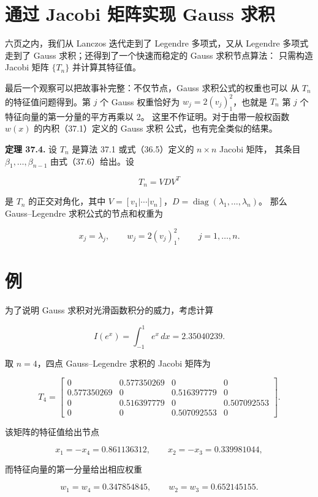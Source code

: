 \documentclass[UTF8,fontset=none,12pt]{ctexart}
\begin{document}
\section*{通过 Jacobi 矩阵实现 Gauss 求积}

六页之内，我们从 Lanczos 迭代走到了 Legendre 多项式，又从 Legendre
多项式走到了 Gauss 求积；还得到了一个快速而稳定的 Gauss 求积节点算法：
只需构造 Jacobi 矩阵 $\{T_n\}$ 并计算其特征值。

最后一个观察可以把故事补完整：不仅节点，Gauss 求积公式的权重也可以
从 $T_n$ 的特征值问题得到。第 $j$ 个 Gauss 权重恰好为
$w_j=2(v_j)_1^2$，也就是 $T_n$ 第 $j$ 个特征向量的第一分量的平方再乘以 2。
这里不作证明。对于由带一般权函数 $w(x)$ 的内积（37.1）定义的 Gauss 求积
公式，也有完全类似的结果。

\textbf{定理 37.4.}
设 $T_n$ 是算法 37.1 或式（36.5）定义的 $n\times n$ Jacobi 矩阵，
其条目 $\beta_1,\ldots,\beta_{n-1}$ 由式（37.6）给出。设

\[
T_n=VDV^T
\]

是 $T_n$ 的正交对角化，其中
$V=[v_1|\cdots|v_n]$，$D=\operatorname{diag}(\lambda_1,\ldots,\lambda_n)$。
那么 Gauss--Legendre 求积公式的节点和权重为

\begin{equation}
x_j=\lambda_j,\qquad
w_j=2(v_j)_1^2,\qquad j=1,\ldots,n.
\tag{37.11}
\end{equation}

\section*{例}

为了说明 Gauss 求积对光滑函数积分的威力，考虑计算

\[
I(e^x)=\int_{-1}^{1}e^x\,dx=2.35040239.
\]

取 $n=4$，四点 Gauss--Legendre 求积的 Jacobi 矩阵为

\[
T_4=
\begin{bmatrix}
0 & 0.577350269 & 0 & 0\\
0.577350269 & 0 & 0.516397779 & 0\\
0 & 0.516397779 & 0 & 0.507092553\\
0 & 0 & 0.507092553 & 0
\end{bmatrix}.
\]

该矩阵的特征值给出节点

\[
x_1=-x_4=0.861136312,\qquad
x_2=-x_3=0.339981044,
\]

而特征向量的第一分量给出相应权重

\[
w_1=w_4=0.347854845,\qquad
w_2=w_3=0.652145155.
\]
\end{document}
